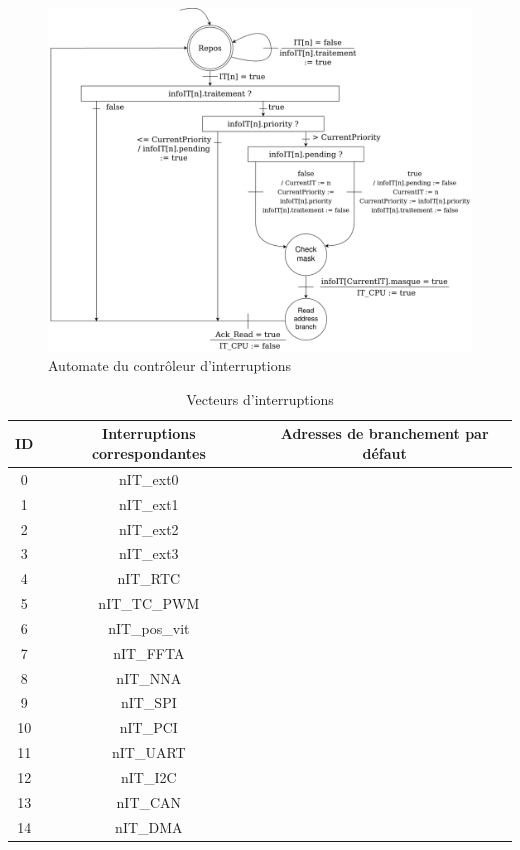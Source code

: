 \begin{figure}[H]
	\centering
	\includegraphics[width=1\linewidth]{figure/spec_fonc_1.png}
	\caption{Automate du contrôleur d'interruptions}
	\label{fig:spec_func_1}
\end{figure} 

\begin{table}[H]
	\centering
	\begin{tabular}{|c|c|c|}
		\hline
		ID & Interruptions correspondantes & Adresses de branchement par défaut\\
		\hline
		0 & nIT\_ext0 & \\
		\hline
		1 & nIT\_ext1 & \\
		\hline
		2 & nIT\_ext2 & \\
		\hline
		3 & nIT\_ext3 &\\
		\hline
		4 & nIT\_RTC &\\
		\hline
		5 & nIT\_TC\_PWM &\\
		\hline
		6 & nIT\_pos\_vit &\\
		\hline
		7 & nIT\_FFTA &\\
		\hline
		8 & nIT\_NNA &\\
		\hline
		9 & nIT\_SPI &\\
		\hline
		10 & nIT\_PCI &\\
		\hline
		11 & nIT\_UART &\\
		\hline
		12 & nIT\_I2C &\\
		\hline
		13 & nIT\_CAN &\\
		\hline
		14 & nIT\_DMA &\\
		\hline
	\end{tabular}
	\caption{Vecteurs d'interruptions}
	\label{tab:vec_int}
\end{table}

